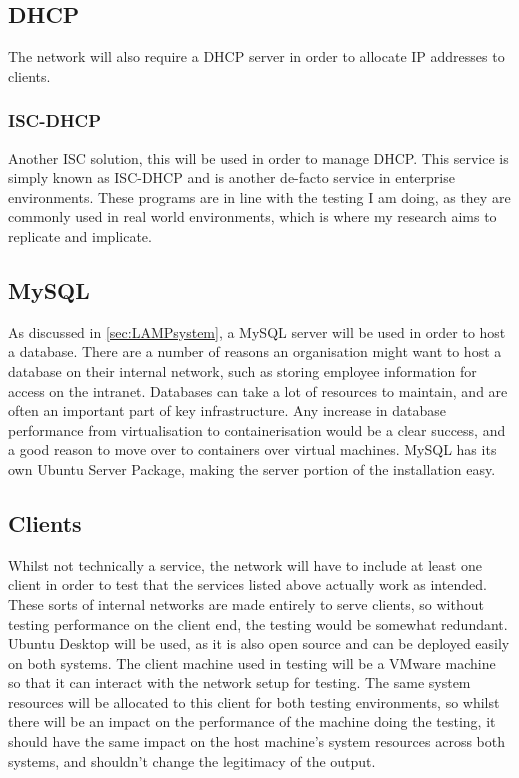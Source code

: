 \subsection{DHCP}
\label{DHCP Spec}
The network will also require a DHCP server in order to allocate IP addresses to clients.

\subsubsection{ISC-DHCP}
Another ISC solution\citep{ISCtimeline}, this will be used in order to manage DHCP. This service is simply known as ISC-DHCP and is another de-facto service in enterprise environments. These programs are in line with the testing I am doing, as they are commonly used in real world environments, which is where my research aims to replicate and implicate.

\subsection{MySQL}
\label{MySQL Server}
As discussed in \ref{sec:LAMPsystem}, a MySQL server will be used in order to host a database. There are a number of reasons an organisation might want to host a database on their internal network, such as storing employee information for access on the intranet. Databases can take a lot of resources to maintain, and are often an important part of key infrastructure. Any increase in database performance from virtualisation to containerisation would be a clear success, and a good reason to move over to containers over virtual machines. MySQL has its own Ubuntu Server Package, making the server portion of the installation easy.

\subsection{Clients}
Whilst not technically a service, the network will have to include at least one client in order to test that the services listed above actually work as intended. These sorts of internal networks are made entirely to serve clients, so without testing performance on the client end, the testing would be somewhat redundant. Ubuntu Desktop will be used, as it is also open source and can be deployed easily on both systems. The client machine used in testing will be a VMware machine so that it can interact with the network setup for testing. The same system resources will be allocated to this client for both testing environments, so whilst there will be an impact on the performance of the machine doing the testing, it should have the same impact on the host machine's system resources across both systems, and shouldn't change the legitimacy of the output.

